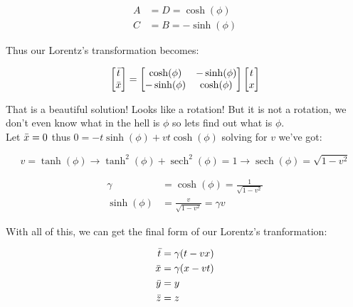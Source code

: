         \begin{align*}
            A &= D = \cosh(\phi)\\
            C&=B=-\sinh(\phi)
        \end{align*}
        
        Thus our Lorentz's transformation becomes:
        
        \begin{equation}
            \begin{bmatrix}
            \Bar{t}\\
            \Bar{x}
            \end{bmatrix}
            =
            \begin{bmatrix}
            \cosh(\phi) & -\sinh(\phi)\\
            -\sinh(\phi) & \cosh(\phi)
            \end{bmatrix}
            \begin{bmatrix}
            t\\
            x
            \end{bmatrix}
        \end{equation}
        
        That is a beautiful solution! Looks like a rotation! But it is not a rotation, we don't even know what in the hell is $\phi$ so lets find out what is $\phi$.\\
        
        Let $\Bar{x} = 0$ thus $0 = -t\sinh(\phi) + vt\cosh(\phi)$ solving for $v$ we've got:
        
        \begin{equation*}
            v = \tanh(\phi) \rightarrow \tanh^2(\phi)+ \operatorname{sech}^2(\phi) = 1 \rightarrow \operatorname{sech}(\phi) = \sqrt{1 - v^2}
        \end{equation*}
        
        \begin{align}
            \gamma &= \cosh(\phi) = \frac{1}{\sqrt{1 - v^2}}\\
            \sinh(\phi) &= \frac{v}{\sqrt{1 - v^2}} = \gamma v
        \end{align}
        
        With all of this, we can get the final form of our Lorentz's tranformation:
        
        \begin{align*}
            \Bar{t} &= \gamma(t-vx)\\
            \Bar{x} &= \gamma(x-vt)\\
            \Bar{y} &= y\\
            \Bar{z} &= z
        \end{align*}
        
